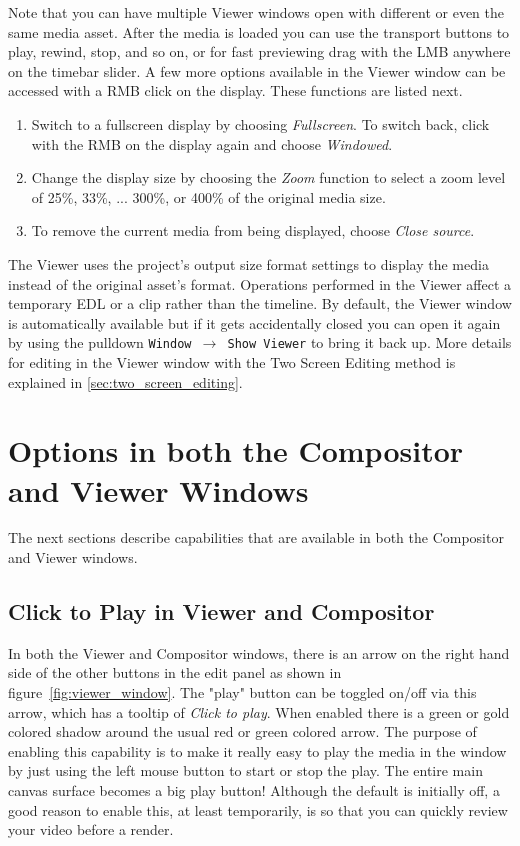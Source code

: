 Note that you can have multiple Viewer windows open with different or even the same media asset.
After the media is loaded you can use the transport buttons to play, rewind, stop, and so on, or
for fast previewing drag with the LMB anywhere on the timebar slider.  A few more options
available in the Viewer window can be accessed with a RMB click on the display.  These functions
are listed next.

\begin{enumerate}
    \item  Switch to a fullscreen display by choosing \textit{Fullscreen}.  To switch back, click
with the RMB on the display again and choose \textit{Windowed}.
    \item  Change the display size by choosing the \textit{Zoom} function to select a zoom level of
25\%, 33\%, ... 300\%, or 400\% of the original media size.
    \item  To remove the current media from being displayed, choose \textit{Close source}.
\end{enumerate}

The Viewer uses the project's output size format settings to display the media instead of the
original asset's format. Operations performed in the Viewer affect a temporary EDL or a clip rather
than the timeline.  By default, the Viewer window is automatically available but if it gets
accidentally closed you can open it again by using the pulldown \texttt{Window $\rightarrow$ Show
Viewer} to bring it back up.  More details for editing in the Viewer window with the Two Screen
Editing method is explained in \ref{sec:two_screen_editing}.

\section{Options in both the Compositor and Viewer Windows}%
\label{sec:options_in_both_the_compositor_and_viewer_windows}

The next sections describe capabilities that are available in both the Compositor and Viewer windows.

\subsection{Click to Play in Viewer and Compositor}%
\label{sub:click_to_play_in_viewer_and_compositor}

In both the Viewer and Compositor windows, there is an arrow on the right hand side of the other
buttons in the edit panel as shown in figure~\ref{fig:viewer_window}.  The "play" button can be
toggled on/off via this arrow, which has a tooltip of \textit{Click to play}.  When enabled there
is a green or gold colored shadow around the usual red or green colored arrow.
The purpose of enabling this capability is to make it really easy to play the media in the window
by just using the left mouse button to start or stop the play.  The entire main canvas surface
becomes a big play button!  Although the default is initially off, a good reason to enable this,
at least temporarily, is so that you can quickly review your video before a render.
 
